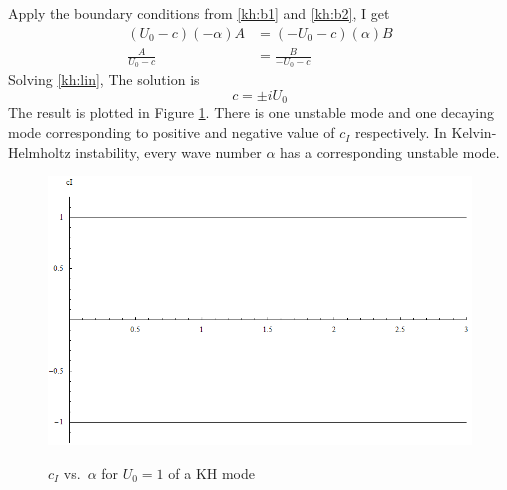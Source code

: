 \newslide
Apply the boundary conditions from \eqref{kh:b1} and \eqref{kh:b2},
I get
\begin{subequations}\label{kh:lin}
\begin{align}
    (U_0-c)(-\alpha)A&=(-U_0-c)(\alpha)B\label{kh:lin1}\\
    \frac{A}{U_0-c}&=\frac{B}{-U_0-c}\label{kh:lin2}
\end{align}
\end{subequations}
Solving \eqref{kh:lin}, The solution is
\begin{equation}\label{lh:c}
    \boxed{c=\pm i U_0}
\end{equation}
\newslide
The result is plotted in Figure \ref{kh1}. There is one unstable
mode and one decaying mode corresponding to positive and negative
value of $c_I$ respectively. In Kelvin-Helmholtz instability, every
wave number $\alpha$ has a corresponding unstable mode.
\begin{figure}[htpb]
  \centering
  \includegraphics[width=0.9\textheight]{kh1.png}\\
  \caption{$c_I$ vs.~$\alpha$ for $U_0=1$ of a KH mode}\label{kh1}
\end{figure}
